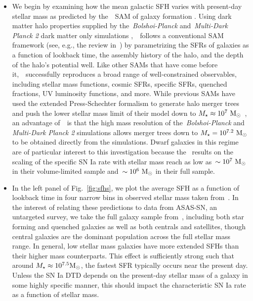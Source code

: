 \documentclass[ms.tex]{subfiles}
\begin{document}
\begin{itemize}

	\item We begin by examining how the mean galactic SFH varies with
	present-day stellar mass as predicted by the~\um~SAM of galaxy formation
	\citep{Behroozi2019}.
	Using dark matter halo properties supplied by the~\textit{Bolshoi-Planck}
	and~\textit{Multi-Dark Planck 2} dark matter only simulations
	\citep{Klypin2016, RodriguezPuebla2016},~\um~follows a conventional
	SAM framework (see, e.g., the review in~\citealp{Somerville2015a}) by
	parametrizing the SFRs of galaxies as a function of lookback time, the
	assembly history of the halo, and the depth of the halo's potential well.
	Like other SAMs that have come before it,~\um~successfully reproduces a
	broad range of well-constrained observables, including stellar mass
	functions, cosmic SFRs, specific SFRs, quenched fractions, UV luminosity
	functions, and more.
	While previous SAMs have used the extended Press-Schechter formalism
	\citep{Press1974, Bond1991} to generate halo merger trees and push the
	lower stellar mass limit of their model down to
	$M_\star \approx 10^7~\text{M}_\odot$~\citep*[e.g.][]{Somerville2015b}, an advantage
	of~\um~is that the high mass resolution of the~\textit{Bolshoi-Planck} and
	\textit{Multi-Dark Planck 2} simulations allows merger trees down to
	$M_\star = 10^{7.2}~\text{M}_\odot$ to be obtained directly from the simulations.
	Dwarf galaxies in this regime are of particular interest to this
	investigation because the~\citet{Brown2019} results on the scaling of the
	specific SN Ia rate with stellar mass reach as low as~$\sim10^7~\text{M}_\odot$ in
	their volume-limited sample and~$\sim10^6~\text{M}_\odot$ in their full sample.

	\item In the left panel of Fig.~\ref{fig:sfhs}, we plot the average SFH as
	a function of lookback time in four narrow bins in observed stellar mass
	taken from~\um.
	In the interest of relating these predictions to data from ASAS-SN, an
	untargeted survey, we take the full galaxy sample from~\um, including both
	star forming and quenched galaxies as well as both centrals and satellites,
	though central galaxies are the dominant population across the full stellar
	mass range.
	In general, low stellar mass galaxies have more extended SFHs than their
	higher mass counterparts.
	This effect is sufficiently strong such that around
	$M_\star \approx 10^{7.5} \text{M}_\odot$, the fastest SFR typically occurs near the
	present day.
	Unless the SN Ia DTD depends on the present-day stellar mass of a galaxy
	in some highly specific manner, this should impact the characteristic SN Ia
	rate as a function of stellar mass.


\end{itemize}
\end{document}
